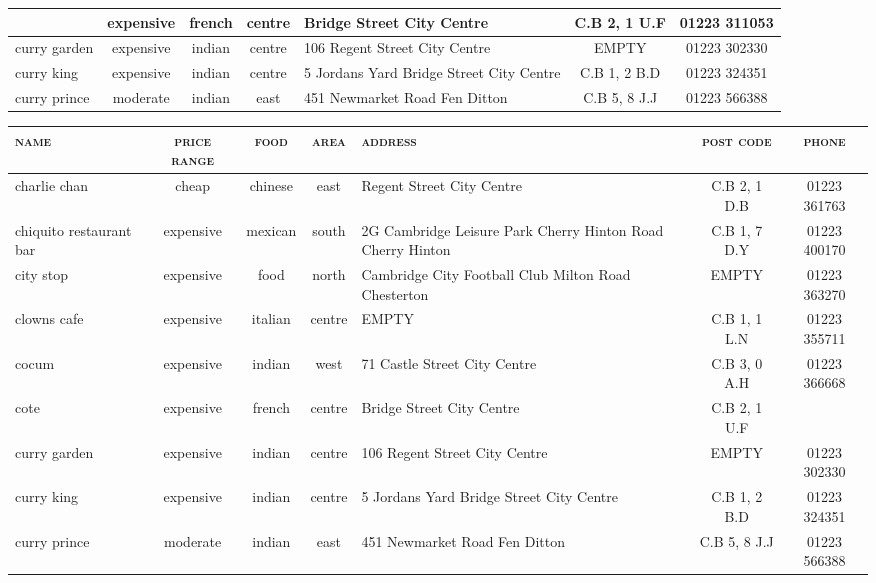 \documentclass[11pt,letterpaper]{article}
\newcommand{\cellattn}[2]{\cellcolor{navyblue!#1}{#2}}
\begin{document}
\begin{table*}[!thbp]
\begin{subtable}{\textwidth}
\begin{tabular}{| p{2cm} | c | c | c | p{3cm} | c | c |}
    \hline
\cellattn{53}{cote} & expensive & french & centre & Bridge Street City Centre & C.B 2, 1 U.F & 01223 311053 \\
    \hline
curry garden & expensive & indian & centre & 106 Regent Street City Centre & EMPTY & 01223 302330 \\
    \hline
curry king & expensive & indian & centre & 5 Jordans Yard Bridge Street City Centre & C.B 1, 2 B.D & 01223 324351 \\
    \hline
curry prince & moderate & indian & east & 451 Newmarket Road Fen Ditton & C.B 5, 8 J.J & 01223 566388 \\
    \hline
  \end{tabular}
  \caption{Attention heat map: \texttt{cote} is a great restaurant serving
    french food and it is in the expensive price range.}
\end{subtable}
  \begin{subtable}{\textwidth}
  \begin{tabular}{| p{2cm} | c | c | c | p{3cm} | c | c |}
    \hline
    \textsc{name} & \textsc{price range} & \textsc{food} & \textsc{area} & \textsc{address} & \textsc{post code} & \textsc{phone} \\
    \hline
    charlie chan & cheap & chinese & east & Regent Street City Centre & C.B 2, 1 D.B & 01223 361763 \\
    \hline
    chiquito restaurant bar & expensive & mexican & south & 2G Cambridge Leisure Park Cherry Hinton Road Cherry Hinton & C.B 1, 7 D.Y & 01223 400170 \\
    \hline
    city stop & expensive & food & north & Cambridge City Football Club Milton Road Chesterton & EMPTY & 01223 363270 \\
    \hline
    clowns cafe & expensive & italian & centre & EMPTY & C.B 1, 1 L.N & 01223 355711\\
    \hline
    cocum & expensive & indian & west & 71 Castle Street City Centre & C.B 3, 0 A.H & 01223 366668 \\
    \hline
    cote & expensive & french & centre & Bridge Street City Centre & C.B 2, 1 U.F & \cellattn{99}{01223 311053} \\
    \hline
    curry garden & expensive & indian & centre & 106 Regent Street City Centre & EMPTY & 01223 302330 \\
    \hline
    curry king & expensive & indian & centre & 5 Jordans Yard Bridge Street City Centre & C.B 1, 2 B.D & 01223 324351 \\
    \hline
    curry prince & moderate & indian & east & 451 Newmarket Road Fen Ditton & C.B 5, 8 J.J & 01223 566388 \\
    \hline
  \end{tabular}
  \caption{Attention heap map: The phone number of cote is \texttt{01223
      311053} . }
\end{subtable}
\caption{Dialogue visualization 1}
\label{tab:example_vis}
\end{table*}
\end{document}
